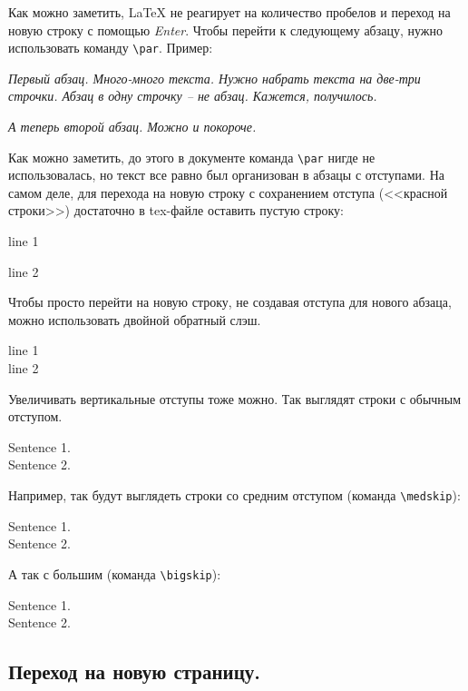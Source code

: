 \documentclass[12pt]{article}
\begin{document}
Как можно заметить, \LaTeX{} не реагирует на количество пробелов и переход на новую строку с помощью \textit{Enter}. Чтобы перейти к следующему абзацу, нужно использовать команду \texttt{\textbackslash par}. Пример:

\textit{Первый абзац. Много-много текста. Нужно набрать текста на две-три строчки. Абзац в одну строчку -- не абзац.  Кажется, получилось.}  \par
\textit{А теперь второй абзац. Можно и покороче.}

Как можно заметить, до этого в документе команда \texttt{\textbackslash par} нигде не использовалась, но текст все равно был организован в абзацы с отступами. На самом деле, для перехода на новую строку с сохранением отступа (<<красной строки>>) достаточно в tex-файле оставить пустую строку:

\begin{LTXexample}
line 1

line 2
\end{LTXexample}


Чтобы просто перейти на новую строку, не создавая отступа для нового абзаца, можно использовать двойной обратный слэш. \\ 

\begin{LTXexample}
line 1 \\
line 2
\end{LTXexample}

Увеличивать вертикальные отступы тоже можно. Так выглядят строки с обычным отступом.

\begin{LTXexample}
Sentence 1.  \\
Sentence 2. 
\end{LTXexample}

Например, так будут выглядеть строки со средним отступом (команда \texttt{\textbackslash medskip}): 

\begin{LTXexample}
Sentence 1. \medskip \\
Sentence 2. 
\end{LTXexample}

А так с большим (команда \texttt{\textbackslash bigskip}): 

\begin{LTXexample}
Sentence 1. \bigskip \\
Sentence 2. 
\end{LTXexample}

\subsection{Переход на новую страницу.}
\end{document}
